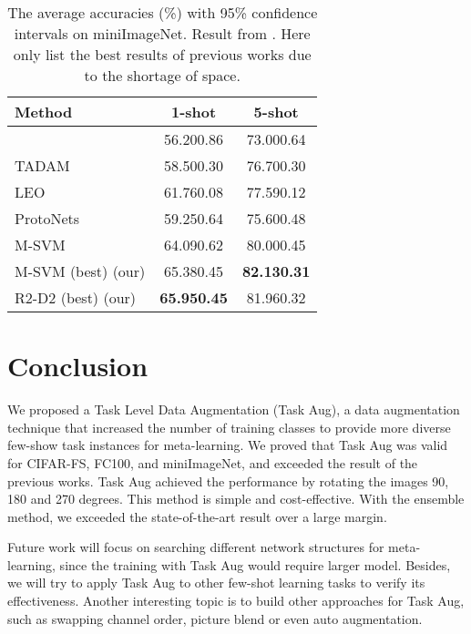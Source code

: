 \documentclass[10pt,twocolumn,letterpaper]{article}
\begin{document}
\begin{table}[t]
\caption{The average accuracies (\%) with 95\% confidence intervals on miniImageNet. Result from \cite{lee2019meta}. Here only list the best results of previous works due to the shortage of space.}
\label{mini_soa}
\begin{center}
\begin{tabular}{lcc}
\toprule[1pt]
\textbf{Method} & \textbf{1-shot} & \textbf{5-shot}\\
\hline
\cite{gidaris2018dynamic} & 56.200.86 & 73.000.64 \\
TADAM~\cite{oreshkin2018tadam} & 58.500.30 & 76.700.30\\
LEO~\cite{rusu2018meta} & 61.760.08 & 77.590.12\\
ProtoNets~\cite{snell2017prototypical} & 59.250.64 & 75.600.48\\
M-SVM~\cite{lee2019meta} & 64.090.62 & 80.000.45\\
\hline
M-SVM (best) (our) & 65.380.45 & \textbf{82.130.31}\\
R2-D2 (best) (our) & \textbf{65.950.45} & 81.960.32\\
\bottomrule[1pt]
\end{tabular}
\end{center}
\end{table}




\section{Conclusion}
We proposed a Task Level Data Augmentation (Task Aug), a data augmentation technique that increased the number of training classes to provide more diverse few-show task instances for meta-learning. We proved that Task Aug was valid for CIFAR-FS, FC100, and miniImageNet, and exceeded the result of the previous works. Task Aug achieved the performance by rotating the images 90, 180 and 270 degrees. This method is simple and cost-effective. With the ensemble method, we exceeded the state-of-the-art result over a large margin.

Future work will focus on searching different network structures for meta-learning, since the training with Task Aug would require larger model. Besides, we will try to apply Task Aug to other few-shot learning tasks to verify its effectiveness. Another interesting topic is to build other approaches for Task Aug, such as swapping channel order, picture blend or even auto augmentation.

{\small


}
\end{document}
